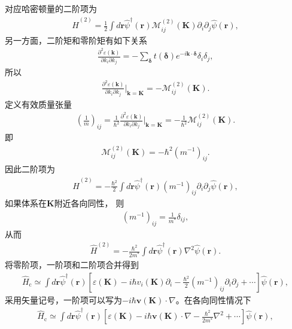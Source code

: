\documentclass[10pt, oneside]{article}
\begin{document}
对应哈密顿量的二阶项为
\begin{align}
	\hat{H}^{\left(2\right)} = \frac{1}{2} \int d \bm{r} \hat{\psi}^{\dagger} \left(\bm{r}\right) \mathcal{M}^{\left(2\right)}_{ij} \left(\bm{K}\right) \partial_{i} \partial_{j} \hat{\psi} \left(\bm{r}\right),
\end{align}
另一方面，二阶矩和零阶矩有如下关系
\begin{align}
	\frac{\partial^{2} \varepsilon \left(\bm{k}\right)}{\partial k_i \partial k_j} = - \sum_{\bm{\delta}} t \left(\bm{\delta}\right)  e^{-i \bm{k} \cdot \bm{\delta}} \delta_{i} \delta_{j},
\end{align}
所以
\begin{align}
	\frac{\partial^{2} \varepsilon \left(\bm{k}\right)}{\partial k_i \partial k_j} \bigg|_{\bm{k} = \bm{K}} = - \mathcal{M}^{\left(2\right)}_{ij} \left(\bm{K}\right).
\end{align}
定义有效质量张量
\begin{align}
	\left(\frac{1}{m}\right)_{ij} = \frac{1}{\hbar^{2}} \frac{\partial^{2} \varepsilon \left(\bm{k}\right)}{\partial k_i \partial k_j} \bigg|_{\bm{k} = \bm{K}} = -  \frac{1}{\hbar^{2}} \mathcal{M}^{\left(2\right)}_{ij} \left(\bm{K}\right).
\end{align}
即
\begin{align}
	\mathcal{M}^{\left(2\right)}_{ij} \left(\bm{K}\right) = - \hbar^{2} \left(m^{-1}\right)_{ij}.
\end{align}
因此二阶项为
\begin{align}
	\hat{H}^{\left(2\right)} = - \frac{\hbar^{2}}{2} \int d \bm{r} \hat{\psi}^{\dagger} \left(\bm{r}\right) \left(m^{-1}\right)_{ij} \partial_{i} \partial_{j} \hat{\psi} \left(\bm{r}\right),
\end{align}
如果体系在\(\bm{K}\)附近各向同性， 则
\begin{align}
	\left(m^{-1}\right)_{ij} = \frac{1}{m^{*}} \delta_{ij},
\end{align}
从而
\begin{align}
	\hat{H}^{\left(2\right)} = - \frac{\hbar^{2}}{ 2 m^{*}} \int d \bm{r} \hat{\psi}^{\dagger} \left(\bm{r}\right) \nabla^{2} \hat{\psi} \left(\bm{r}\right).
\end{align}
将零阶项，一阶项和二阶项合并得到
\begin{align}
	\hat{H}_{\mathrm{c}} \simeq \int d \bm{r}  \hat{\psi}^{\dagger} \left(\bm{r}\right) \left[\varepsilon \left(\bm{K}\right) - i \hbar v_i \left(\bm{K}\right) \partial_{i} - \frac{\hbar^{2}}{2} \left(m^{-1}\right)_{ij} \partial_{i} \partial_{j} + \cdots \right] \hat{\psi} \left(\bm{r}\right),
\end{align}
采用矢量记号，一阶项可以写为\(- i \hbar \bm{v} \left(\bm{K}\right) \cdot \nabla\)。在各向同性情况下
\begin{align}
	\boxed{
		\hat{H}_{\mathrm{c}} \simeq \int d \bm{r}  \hat{\psi}^{\dagger} \left(\bm{r}\right) \left[\varepsilon \left(\bm{K}\right) - i \hbar \bm{v} \left(\bm{K}\right) \cdot \nabla - \frac{\hbar^{2}}{2 m^{*}} \nabla^{2} + \cdots \right] \hat{\psi} \left(\bm{r}\right)
	},
\end{align}
\end{document}
